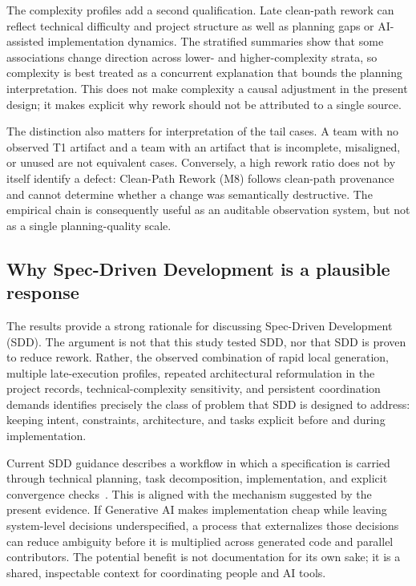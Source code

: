 The complexity profiles add a second qualification. Late clean-path rework can
reflect technical difficulty and project structure as well as planning gaps or
AI-assisted implementation dynamics. The stratified summaries show that some
associations change direction across lower- and higher-complexity strata, so
complexity is best treated as a concurrent explanation that bounds the
planning interpretation. This does not make complexity a causal adjustment in
the present design; it makes explicit why rework should not be attributed to a
single source.

The distinction also matters for interpretation of the tail cases. A team with
no observed T1 artifact and a team with an artifact that is incomplete,
misaligned, or unused are not equivalent cases. Conversely, a high rework ratio
does not by itself identify a defect: Clean-Path Rework (M8) follows clean-path provenance and
cannot determine whether a change was semantically destructive. The empirical
chain is consequently useful as an auditable observation system, but not as a
single planning-quality scale.

\subsection{Why Spec-Driven Development is a plausible response}

The results provide a strong rationale for discussing Spec-Driven Development
(SDD). The argument is not that this study tested SDD, nor that SDD is proven
to reduce rework. Rather, the observed combination of rapid local generation,
multiple late-execution profiles, repeated architectural reformulation in the
project records, technical-complexity sensitivity, and persistent coordination
demands identifies precisely the class of problem that SDD is designed to
address: keeping intent, constraints, architecture, and tasks explicit before
and during implementation.

Current SDD guidance describes a workflow in which a specification is carried
through technical planning, task decomposition, implementation, and explicit
convergence checks~\cite{github2025spec,thoughtworks202Xspec}. This is aligned
with the mechanism suggested by the present evidence. If Generative AI makes
implementation cheap while leaving system-level decisions underspecified, a
process that externalizes those decisions can reduce ambiguity before it is
multiplied across generated code and parallel contributors. The potential
benefit is not documentation for its own sake; it is a shared, inspectable
context for coordinating people and AI tools.

